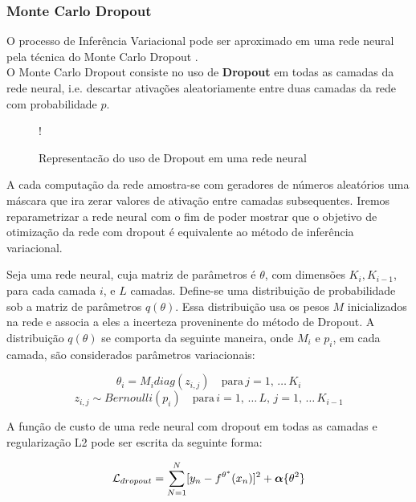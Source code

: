 \subsubsection{Monte Carlo Dropout}

O processo de Inferência Variacional pode ser aproximado em uma rede neural pela técnica do Monte Carlo Dropout \citep{dropbayes}. \\

O Monte Carlo Dropout consiste no uso de \textbf{Dropout} em todas as camadas da rede
neural, i.e. descartar ativações aleatoriamente entre duas camadas da rede com
probabilidade $p$.\\

\begin{figure}
  \centering
  \resizebox {\columnwidth} {!} {}
  \label{fig:dropout}
  \caption{Representacão do uso de Dropout em uma rede neural}
\end{figure}


A cada computação da rede amostra-se com geradores de números aleatórios uma
máscara que ira zerar valores de ativação entre camadas subsequentes. Iremos
reparametrizar a rede neural com o fim de poder mostrar que o objetivo de
otimização da rede com dropout é equivalente ao método de inferência variacional.

Seja uma rede neural, cuja matriz de parâmetros é $\theta$, com dimensões
$K_i,K_{i-1}$, para cada camada $i$, e $L$ camadas. Define-se uma distribuição
de probabilidade sob a matriz de parâmetros $q(\theta)$.
Essa distribuição usa os pesos $M$ inicializados na rede e associa a eles a incerteza proveninente do
método de Dropout. A distribuição $q(\theta)$ se comporta da seguinte maneira,
onde $M_i$ e $p_i$, em cada camada, são considerados parâmetros variacionais:

\newcommand{\diag}{\mathop{\mathrm{diag}}}

\[
  \theta_i   = M_i   diag (z_{i,j}) \quad \text{para} \, j=1, \, \dots  \,K_i
\] 
\[
  z_{i,j}  \sim Bernoulli(p_i) \quad  \text{para} \, i=1, \, \dots \, L, \, j=1, \, \dots \, K_{i-1}
\]   


A função de custo de uma rede neural com dropout em todas as camadas  e
regularização L2 pode ser escrita da seguinte forma:

\begin{equation}
  \mathcal{L}_{dropout} = \sum^N_{N=1} [y_n - \mathnormal{f}^{\theta^*}(x_n)]^2
  + \boldsymbol{\alpha}\{\theta^2\}
\label{eq:dropob}
\end{equation}


